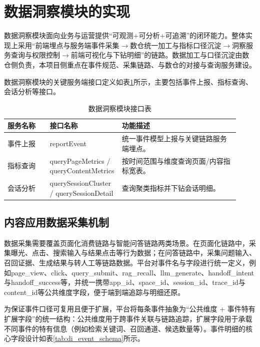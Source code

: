 \section{数据洞察模块的实现}
\label{sec:impl_di}

数据洞察模块面向业务与运营提供“可观测+可分析+可追溯”的闭环能力。整体实现上采用“前端埋点与服务端事件采集$\rightarrow$数仓统一加工与指标口径沉淀$\rightarrow$洞察服务查询与权限控制$\rightarrow$前端可视化与下钻明细”的链路。数据加工与口径沉淀由数仓侧负责，本项目侧重点在事件规范、采集链路、与数仓的对接与查询服务建设。

数据洞察模块的关键服务端接口定义如表\ref{tab:di_api}所示，主要包括事件上报、指标查询、会话分析等接口。

\begin{table}[!htbp]
  \centering
  \caption{数据洞察模块接口表}
  \label{tab:di_api}
  \small
  \begin{tabular}{>{\raggedright\arraybackslash}p{0.18\linewidth}|>{\raggedright\arraybackslash}p{0.24\linewidth}|>{\raggedright\arraybackslash}p{0.50\linewidth}}
    \hline
    服务名称 & 接口名称 & 功能描述 \\ \hline
    事件上报 & reportEvent & 统一事件模型上报与关键链路服务端埋点。 \\ \hline
    指标查询 & queryPageMetrics / queryContentMetrics & 按时间范围与维度查询页面/内容指标宽表。 \\ \hline
    会话分析 & querySessionCluster / querySessionDetail & 查询聚类指标并下钻会话明细。 \\ \hline
  \end{tabular}
\end{table}

\subsection{内容应用数据采集机制}
\label{subsec:impl_di_collect}

数据采集需要覆盖页面化消费链路与智能问答链路两类场景。在页面化链路中，采集曝光、点击、搜索输入与结果点击等行为数据；在问答链路中，采集问题输入、召回证据、生成结果与转人工等链路数据。平台对事件名与字段进行统一定义，例如page\_\allowbreak view、click、query\_\allowbreak submit、rag\_\allowbreak recall、llm\_\allowbreak generate、handoff\_\allowbreak intent与handoff\_\allowbreak success等，并统一携带app\_\allowbreak id、space\_\allowbreak id、session\_\allowbreak id、trace\_\allowbreak id与content\_\allowbreak id等公共维度字段，便于端到端追踪与明细还原。

为保证事件口径可复用且便于扩展，平台将每条事件抽象为“公共维度 + 事件特有扩展字段”的统一结构：公共维度用于跨事件关联与链路追踪，扩展字段用于承载不同事件的特有信息（例如检索关键词、召回通道、候选数量等）。事件明细的核心字段设计如表\ref{tab:di_event_schema}所示。

